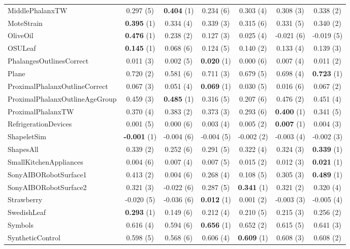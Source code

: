 \begin{table}[ht]
\begin{adjustbox}{width=\textwidth}
\begin{tabular}{lcccccc}
MiddlePhalanxTW & 0.297 (5) & \textbf{0.404} (1) & 0.234 (6) & 0.303 (4) & 0.308 (3) & 0.338 (2) \\
MoteStrain & \textbf{0.395} (1) & 0.334 (4) & 0.339 (3) & 0.315 (6) & 0.331 (5) & 0.340 (2) \\
OliveOil & \textbf{0.476} (1) & 0.238 (2) & 0.127 (3) & 0.025 (4) & -0.021 (6) & -0.019 (5) \\
OSULeaf & \textbf{0.145} (1) & 0.068 (6) & 0.124 (5) & 0.140 (2) & 0.133 (4) & 0.139 (3) \\
PhalangesOutlinesCorrect & 0.011 (3) & 0.002 (5) & \textbf{0.020} (1) & 0.000 (6) & 0.007 (4) & 0.011 (2) \\
Plane & 0.720 (2) & 0.581 (6) & 0.711 (3) & 0.679 (5) & 0.698 (4) & \textbf{0.723} (1) \\
ProximalPhalanxOutlineCorrect & 0.067 (3) & 0.051 (4) & \textbf{0.069} (1) & 0.030 (5) & 0.016 (6) & 0.067 (2) \\
ProximalPhalanxOutlineAgeGroup & 0.459 (3) & \textbf{0.485} (1) & 0.316 (5) & 0.207 (6) & 0.476 (2) & 0.451 (4) \\
ProximalPhalanxTW & 0.370 (4) & 0.383 (2) & 0.373 (3) & 0.293 (6) & \textbf{0.400} (1) & 0.341 (5) \\
RefrigerationDevices & 0.001 (5) & 0.000 (6) & 0.003 (4) & 0.005 (2) & \textbf{0.007} (1) & 0.004 (3) \\
ShapeletSim & \textbf{-0.001} (1) & -0.004 (6) & -0.004 (5) & -0.002 (2) & -0.003 (4) & -0.002 (3) \\
ShapesAll & 0.339 (2) & 0.252 (6) & 0.291 (5) & 0.322 (4) & 0.324 (3) & \textbf{0.339} (1) \\
SmallKitchenAppliances & 0.004 (6) & 0.007 (4) & 0.007 (5) & 0.015 (2) & 0.012 (3) & \textbf{0.021} (1) \\
SonyAIBORobotSurface1 & 0.413 (2) & 0.004 (6) & 0.268 (4) & 0.108 (5) & 0.305 (3) & \textbf{0.489} (1) \\
SonyAIBORobotSurface2 & 0.321 (3) & -0.022 (6) & 0.287 (5) & \textbf{0.341} (1) & 0.321 (2) & 0.320 (4) \\
Strawberry & -0.020 (5) & -0.036 (6) & \textbf{0.012} (1) & 0.001 (2) & -0.003 (3) & -0.005 (4) \\
SwedishLeaf & \textbf{0.293} (1) & 0.149 (6) & 0.212 (4) & 0.210 (5) & 0.215 (3) & 0.256 (2) \\
Symbols & 0.616 (4) & 0.594 (6) & \textbf{0.656} (1) & 0.652 (2) & 0.615 (5) & 0.641 (3) \\
SyntheticControl & 0.598 (5) & 0.568 (6) & 0.606 (4) & \textbf{0.609} (1) & 0.608 (3) & 0.608 (2) \\

\end{tabular}
\end{adjustbox}
\end{table}
